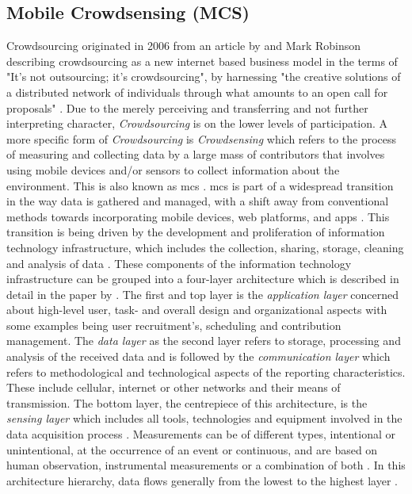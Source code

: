 \subsection{Mobile Crowdsensing (MCS)}\label{subsec:mcs} %

Crowdsourcing originated in 2006 from an article by \autocite{howeRiseCrowdsourcing} and Mark Robinson describing crowdsourcing as a new internet based business model in the terms of "It's not outsourcing; it's crowdsourcing", by harnessing "the creative solutions of a distributed network of individuals through what amounts to an open call for proposals" \autocite[76]{brabhamCrowdsourcingModelProblem2008}. Due to the merely perceiving and transferring and not further interpreting character, \textit{Crowdsourcing} is on the lower levels of participation. A more specific form of \textit{Crowdsourcing} is \textit{Crowdsensing} which refers to the process of measuring and collecting data by a large mass of contributors that involves using mobile devices and/or sensors to collect information about the environment. This is also known as \acrfull{mcs} \autocite{guoParticipatorySensingMobile2014, liuSurveyMobileCrowdsensing2018}.\newline
\acrshort{mcs} is part of a widespread transition in the way data is gathered and managed, with a shift away from conventional methods towards incorporating mobile devices, web platforms, and apps \autocite{capponiSurveyMobileCrowdsensing2019, sanllorentecapdevilaSuccessFactorsCitizen2020}. This transition is being driven by the development and proliferation of information technology infrastructure, which includes the collection, sharing, storage, cleaning and analysis of data \autocite{fraislCitizenScienceEnvironmental2022}. These components of the information technology infrastructure can be grouped into a four-layer architecture which is described in detail in the paper by \autocite{capponiSurveyMobileCrowdsensing2019}.
The first and top layer is the \textit{application layer} concerned about high-level user, task- and overall design and organizational aspects with some examples being user recruitment's, scheduling and contribution management. The \textit{data layer} as the second layer refers to storage, processing and analysis of the received data and is followed by the \textit{communication layer} which refers to methodological and technological aspects of the reporting characteristics. These include cellular, internet or other networks and their means of transmission. The bottom layer, the centrepiece of this architecture, is the \textit{sensing layer} which includes all tools, technologies and equipment involved in the data acquisition process \autocite{capponiSurveyMobileCrowdsensing2019}. Measurements can be of different types, intentional or unintentional, at the occurrence of an event or continuous, and are based on human observation, instrumental measurements or a combination of both \autocite{zhengCrowdsourcingMethodsData2018}. In this architecture hierarchy, data flows generally from the lowest to the highest layer \autocite{aceves-buenoCitizenScienceApproach2015,capponiSurveyMobileCrowdsensing2019,zhengCrowdsourcingMethodsData2018}.\newline
